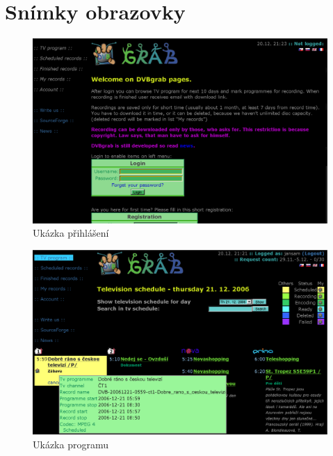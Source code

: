 \documentclass[11pt,twoside,a4paper]{dp_format}%
\begin{document}
\chapter{Snímky obrazovky}
\begin{figure}[ht]
\begin{center}
\includegraphics[width=12cm]{images/scrPrihlaseni.eps}
\caption{Ukázka přihlášení}
\label{fig:scr1}
\end{center}
\end{figure}

\nopagebreak 

\begin{figure}[ht]
\begin{center}
\includegraphics[width=12cm]{images/scrProgram.eps}
\caption{Ukázka programu}
\label{fig:scr2}
\end{center}
\end{figure}

\vfil
\pagebreak
\end{document}

